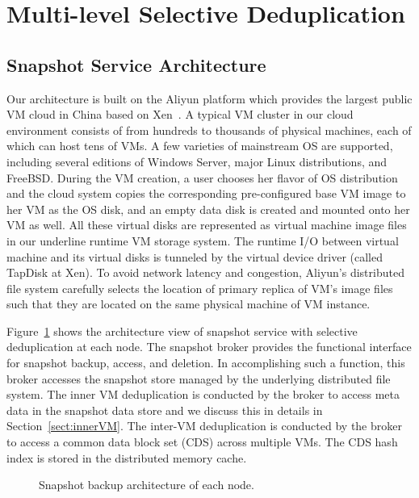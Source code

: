 \section{Multi-level Selective Deduplication}
\label{sect:arch}

\subsection{Snapshot Service Architecture}
Our architecture is built on the Aliyun platform which provides the largest public VM cloud in China 
based on Xen~\cite{Xen2003}. A typical VM cluster in our cloud environment
consists of from hundreds to thousands of physical machines, each of which can
host tens of VMs. A few varieties of mainstream OS are supported,
including several editions of Windows Server, major Linux distributions, and FreeBSD.
During the VM creation, a user chooses her flavor of OS distribution and the cloud system 
copies the corresponding pre-configured base VM image to her VM as the OS disk, 
and an empty data disk is created and mounted onto her VM as well. 
All these virtual disks are represented as virtual machine image files in our
underline runtime VM storage system. The runtime I/O between virtual machine and its virtual
disks is tunneled by the virtual device driver (called TapDisk at Xen). To avoid network latency and congestion, 
Aliyun's distributed file system carefully selects the location of primary replica of VM's 
image files such that they are located on the same physical machine of VM instance.


Figure~\ref{fig:arch} shows the architecture view of snapshot service with selective deduplication
at each node. The  snapshot broker provides the functional interface for  snapshot backup, access, and deletion.
In accomplishing such a function, this broker accesses  the snapshot store managed by the underlying distributed file
system.  The inner VM  deduplication is conducted by the broker to access meta data in the snapshot data store
and we discuss this in details in Section~\ref{sect:innerVM}.
The inter-VM deduplication is conducted by the broker to access a  common data block set (CDS) across multiple VMs.
The CDS hash index is stored in the distributed memory cache. 

\begin{figure}[htbp]
  \centering
  \caption{Snapshot backup architecture of each node.}
  \label{fig:arch}
\end{figure}


